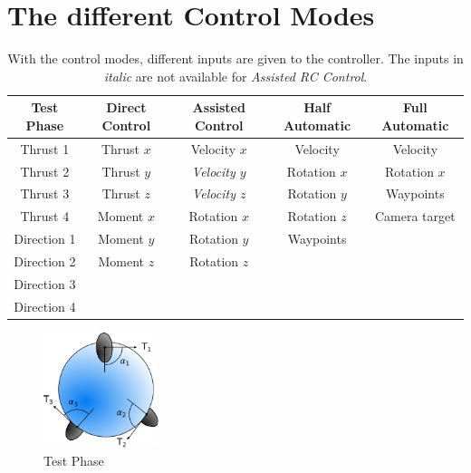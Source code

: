 \graphicspath{{graphics/HMI/}{graphics/control_modes/}}
\chapter{The different Control Modes}
\label{cha:DifferentControlModes}

\begin{table}[H]		%
	\begin{tabular}{c c c c c} %
	Test Phase 		& Direct Control 	& Assisted Control 	& Half Automatic	& Full Automatic  \\
	\toprule[1.25pt]				%
	Thrust 1		& Thrust $x$	& Velocity $x$	& Velocity	& Velocity	\\
	Thrust 2		& Thrust $y$	& \textit{Velocity $y$}	& Rotation $x$	& Rotation $x$\\
	Thrust 3		& Thrust $z$	& \textit{Velocity $z$}	& Rotation $y$	& Waypoints	\\
	Thrust 4		& Moment $x$	& Rotation $x$	& Rotation $z$	&	Camera target\\
	Direction 1		& Moment $y$	& Rotation $y$	& Waypoints	&	\\
	Direction 2		& Moment $z$	& Rotation $z$	&		&	\\
	Direction 3		& 		& 		&		&	\\
	Direction 4		& 		& 		&		&	\\

	\bottomrule[1.25pt]
	\end{tabular} 
	\caption[The different control modes]{With the control modes, different inputs are given to the controller. The inputs in \textit{italic} are not available for \textit{Assisted RC  Control}.}
	\label{table:control_modes}
\end{table}

\begin{figure}[H] %
	\begin{center}
		\includegraphics[width=0.3\textwidth]{TPC.pdf}
		\caption[Test Phase]{Test Phase}  
		\label{figure:test_phase}		
	\end{center}
\end{figure}

